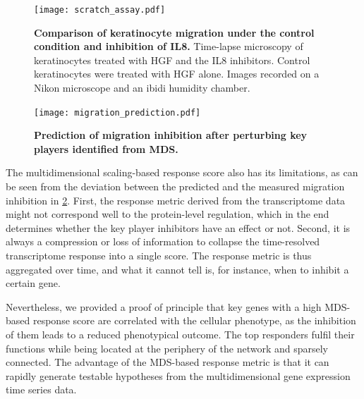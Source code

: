 \begin{figure}[!ht]
\begin{center}
\texttt{[image: scratch\_assay.pdf]}
\end{center}
\caption[Migration of keratinocytes]{
{\bf Comparison of keratinocyte migration under the control condition and 
inhibition of IL8.}
Time-lapse microscopy of keratinocytes treated with HGF and the IL8 inhibitors. 
Control keratinocytes were treated with HGF alone. Images recorded on a Nikon 
microscope and an ibidi humidity chamber.
}
\label{fig:scratch_assay}
\end{figure}

\begin{figure}[!ht]
\begin{center}
\texttt{[image: migration\_prediction.pdf]}
\end{center}
\caption[Prediction of migration inhibition after perturbing key players]{
{\bf Prediction of migration inhibition after perturbing key players identified
from MDS.} 
}
\label{fig:migration_prediction}
\end{figure}

The multidimensional scaling-based response score also has
its limitations, as can be seen from the deviation between
the predicted and the measured migration inhibition in 
\ref{fig:migration_prediction}. First, the response metric
derived from the transcriptome data might not correspond
well to the protein-level regulation, which in the end 
determines whether the key player inhibitors have an effect
or not. Second, it is always a compression or loss of information
to collapse the time-resolved transcriptome response into
a single score. The response metric is thus aggregated over
time, and what it cannot tell is, for instance, when to 
inhibit a certain gene.

Nevertheless, we provided a proof of principle that key genes with a high MDS-based response
score are correlated with the cellular phenotype, as the inhibition of them
leads to a reduced phenotypical outcome.
The top responders fulfil their functions
while being located at the periphery of the network and sparsely connected.
The advantage of the MDS-based response metric is that it can rapidly generate
testable hypotheses from the multidimensional gene expression time series data.

